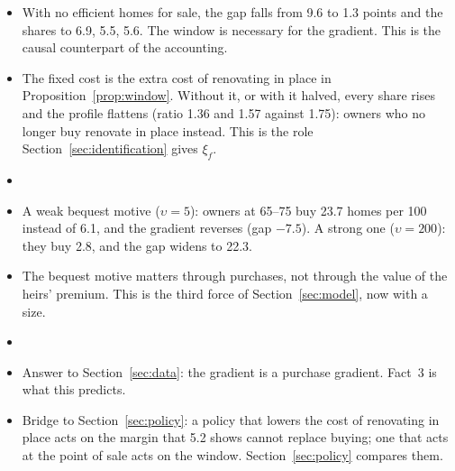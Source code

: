 \begin{itemize}
  \item With no efficient homes for sale, the gap falls from 9.6 to 1.3
    points and the shares to 6.9, 5.5, 5.6. The window is necessary for
    the gradient. This is the causal counterpart of the accounting.
\end{itemize}

\begin{itemize}
  \item The fixed cost is the extra cost of renovating in place in
    Proposition~\ref{prop:window}. Without it, or with it halved, every
    share rises and the profile flattens (ratio 1.36 and 1.57 against
    1.75): owners who no longer buy renovate in place instead. This is the
    role Section~\ref{sec:identification} gives $\xi_f$.
  \item {}
\end{itemize}

\begin{itemize}
  \item A weak bequest motive ($\upsilon=5$): owners at 65--75 buy 23.7
    homes per 100 instead of 6.1, and the gradient reverses (gap $-7.5$).
    A strong one ($\upsilon=200$): they buy 2.8, and the gap widens to 22.3.
  \item The bequest motive matters through purchases, not through the
    value of the heirs' premium. This is the third force of
    Section~\ref{sec:model}, now with a size.
  \item {}
\end{itemize}

\begin{itemize}
  \item Answer to Section~\ref{sec:data}: the gradient is a purchase
    gradient. Fact~3 is what this predicts.
  \item Bridge to Section~\ref{sec:policy}: a policy that lowers the cost
    of renovating in place acts on the margin that 5.2 shows cannot
    replace buying; one that acts at the point of sale acts on the window.
    Section~\ref{sec:policy} compares them.
\end{itemize}

